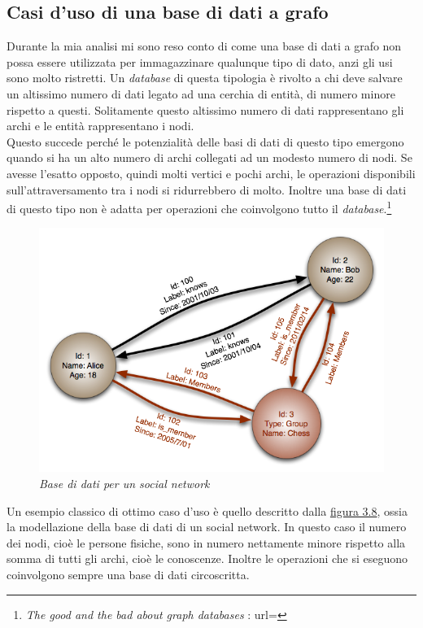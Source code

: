 \subsection{Casi d'uso di una base di dati a grafo}
Durante la mia analisi mi sono reso conto di come una base di dati a grafo non possa essere utilizzata per immagazzinare qualunque tipo di dato, anzi gli usi sono molto ristretti. Un \textit{database} di questa tipologia è rivolto a chi deve salvare un altissimo numero di dati legato ad una cerchia di entità, di numero minore rispetto a questi. Solitamente questo altissimo numero di dati rappresentano gli archi e le entità rappresentano i nodi.\\
Questo succede perché le potenzialità delle basi di dati di questo tipo emergono quando si ha un alto numero di archi collegati ad un modesto numero di nodi. Se avesse l'esatto opposto, quindi molti vertici e pochi archi, le operazioni disponibili sull'attraversamento tra i nodi si ridurrebbero di molto.
Inoltre una base di dati di questo tipo non è adatta per operazioni che coinvolgono tutto il \textit{database}.\footnote{\textit{The good and the bad about graph databases} : url= }
\label{fig:social}
\begin{figure}[!ht]
	\centering
	\includegraphics[scale=0.43]{immagini/social.png}
	\caption{\textit{Base di dati per un social network }}
\end{figure}
\newpage
Un esempio classico di ottimo caso d'uso è quello descritto dalla \hyperlink{fig:social}{figura 3.8}, ossia la modellazione della base di dati di un social network. In questo caso il numero dei nodi, cioè le persone fisiche, sono in numero nettamente minore rispetto alla somma di tutti gli archi, cioè le conoscenze. Inoltre le operazioni che si eseguono coinvolgono sempre una base di dati circoscritta.\\

